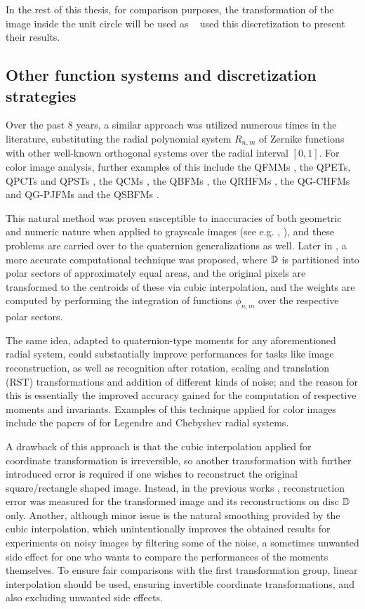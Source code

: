 In the rest of this thesis, for comparison purposes, the transformation of the image inside the unit circle will be used as \citeauthor{qzmi}~\cite{qzmi} used this discretization to present their results.

\subsection{Other function systems and discretization strategies}
Over the past 8 years, a similar approach was utilized numerous times in the literature, substituting the radial polynomial system $R_{n,m}$ of Zernike functions with other well-known orthogonal systems over the radial interval $[0,1]$. For color image analysis, further examples of this include the QFMMs \cite{qfmm}, the QPETs, QPCTs and QPSTs \cite{Li}, the QCMs \cite{Guo}, the QBFMs \cite{Shao}, the QRHFMs \cite{Wang}, the QG-CHFMs and QG-PJFMs \cite{Singh} and the QSBFMs \cite{Yang}.

This natural method was proven susceptible to inaccuracies of both geometric and numeric nature when applied to grayscale images (see e.g.  \cite{LiaoPawlak}, \cite{PawlakLiao}), and these problems are carried over to the quaternion generalizations as well. Later in \cite{Xin}, a more accurate computational technique was proposed, where $\mathbb{D}$ is partitioned into polar sectors of approximately equal areas, and the original pixels are transformed to the centroids of these via cubic interpolation, and the weights are computed by performing the integration of functions $\phi_{n,m}$ over the respective polar sectors.

The same idea, adapted to quaternion-type moments for any aforementioned radial system, could substantially improve performances for tasks like image reconstruction, as well as recognition after rotation, scaling and translation (RST) transformations and addition of different kinds of noise; and the reason for this is essentially the improved accuracy gained for the computation of respective moments and invariants. Examples of this technique applied for color images include the papers of \citeauthor{HosnyLegendre} for Legendre \cite{HosnyLegendre} and Chebyshev \cite{HosnyChebyshev} radial systems.

A drawback of this approach is that the cubic interpolation applied for coordinate transformation is irreversible, so another transformation with further introduced error is required if one wishes to reconstruct the original square/rectangle shaped image. Instead, in the previous works \cite{LiaoPawlak,PawlakLiao,Xin,HosnyLegendre,HosnyChebyshev}, reconstruction error was measured for the transformed image and its reconstructions on disc $\mathbb{D}$ only. Another, although minor issue is the natural smoothing provided by the cubic interpolation, which unintentionally improves the obtained results for experiments on noisy images by filtering some of the noise, a sometimes unwanted side effect for one who wants to compare the performances of the moments themselves. To ensure fair comparisons with the first transformation group, linear interpolation should be used, ensuring invertible coordinate transformations, and also excluding unwanted side effects.

